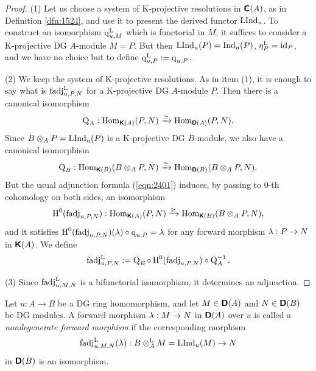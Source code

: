 \begin{proof} \mbox{}

\smallskip \noindent 
(1) Let us choose a system of K-projective resolutions in $\boldsymbol{\mathsf{C}}(A)$, as in 
Definition \ref{dfn:1524}, and use it to present the derived functor 
$\operatorname{LInd}_u$. 
To construct an isomorphism $\operatorname{q}_{u, M}^{\mathrm{L}}$
which is functorial in $M$, it suffices to consider 
a K-projective DG $A$-module $M = P$. But then $\operatorname{LInd}_u(P) = 
\operatorname{Ind}_u(P)$, 
$\eta^{\mathrm{L}}_P = \operatorname{id}_P$,
and we have no choice but to define 
$\operatorname{q}_{u, P}^{\mathrm{L}} := \operatorname{q}_{u, P}$. 

\medskip \noindent
(2) We keep the system of K-projective resolutions. 
As in item (1), it is enough to say what is $\operatorname{fadj}_{u, P, N}^{\mathrm{L}}$ 
for a K-projective DG $A$-module $P$. Then there is a canonical isomorphism 
 \[ \operatorname{Q}_A : \operatorname{Hom}_{\boldsymbol{\mathsf{K}}(A)}(P, N) \xrightarrow{\simeq} 
\operatorname{Hom}_{\boldsymbol{\mathsf{D}}(A)}(P, N) . \]
Since $B \otimes_A P = \operatorname{LInd}_u(P)$ is a K-projective DG $B$-module, we also 
have  a canonical isomorphism 
\[ \operatorname{Q}_B : \operatorname{Hom}_{\boldsymbol{\mathsf{K}}(B)}(B \otimes_A P, N) \xrightarrow{\simeq}
\operatorname{Hom}_{\boldsymbol{\mathsf{D}}(B)}(B \otimes_A P , N) . \]
But the usual adjunction formula (\ref{eqn:2401}) induces, by passing to 
$0$-th cohomology on both sides, an isomorphism 
\[ \operatorname{H}^0(\operatorname{fadj}_{u, P, N})  : \operatorname{Hom}_{\boldsymbol{\mathsf{K}}(A)}(P, N) \xrightarrow{\simeq} 
\operatorname{Hom}_{\boldsymbol{\mathsf{K}}(B)}(B \otimes_A P, N) ,  \]
and it satisfies 
$\operatorname{H}^0(\operatorname{fadj}_{u, P, N}) (\lambda) \circ \operatorname{q}_{u, P} = \lambda$
for any forward morphism $\lambda : P \to N$ in $\boldsymbol{\mathsf{K}}(A)$. 
We define 
\[ \operatorname{fadj}_{u, P, N}^{\mathrm{L}} := \operatorname{Q}_B \circ 
\operatorname{H}^0(\operatorname{fadj}_{u, P, N}) \circ \operatorname{Q}_A^{-1} . \]

\medskip \noindent
(3) Since $\operatorname{fadj}_{u, M, N}^{\mathrm{L}}$ is a bifunctorial isomorphism, 
it determines an adjunction. 
\end{proof}

\begin{dfn} \label{dfn:3191}
Let $u : A \to B$ be a DG ring homomorphism, and let 
$M \in \boldsymbol{\mathsf{D}}(A)$ and $N \in \boldsymbol{\mathsf{D}}(B)$ be DG modules.
A forward morphism $\lambda : M \to N$ in $\boldsymbol{\mathsf{D}}(A)$ over $u$ is called a 
{\em nondegenerate forward morphism}%
%
%
if the corresponding morphism 
\[ \operatorname{fadj}_{u, M, N}^{\mathrm{L}}(\lambda) : B \otimes^{\mathrm{L}}_A M = 
\operatorname{LInd}_u(M) \to N \] 
in $\boldsymbol{\mathsf{D}}(B)$ is an isomorphism.
\end{dfn}

